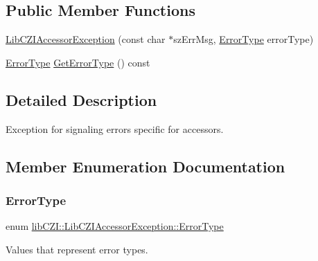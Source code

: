 \subsection*{Public Member Functions}
\begin{DoxyCompactItemize}
\item 
\hyperlink{classlib_c_z_i_1_1_lib_c_z_i_accessor_exception_a4eb949381be1d9ca7e1f1b65f5fdacd0}{Lib\+C\+Z\+I\+Accessor\+Exception} (const char $\ast$sz\+Err\+Msg, \hyperlink{classlib_c_z_i_1_1_lib_c_z_i_accessor_exception_afac26a03ad8be1d8314911a58b9b08b5}{Error\+Type} error\+Type)
\item 
\hyperlink{classlib_c_z_i_1_1_lib_c_z_i_accessor_exception_afac26a03ad8be1d8314911a58b9b08b5}{Error\+Type} \hyperlink{classlib_c_z_i_1_1_lib_c_z_i_accessor_exception_a8d5241a5d61e5d2ae97a6ee4c8f3e39e}{Get\+Error\+Type} () const
\end{DoxyCompactItemize}


\subsection{Detailed Description}
Exception for signaling errors specific for accessors. 

\subsection{Member Enumeration Documentation}
\mbox{\label{classlib_c_z_i_1_1_lib_c_z_i_accessor_exception_afac26a03ad8be1d8314911a58b9b08b5}} 
\subsubsection{\texorpdfstring{Error\+Type}{ErrorType}}
{\footnotesize\ttfamily enum \hyperlink{classlib_c_z_i_1_1_lib_c_z_i_accessor_exception_afac26a03ad8be1d8314911a58b9b08b5}{lib\+C\+Z\+I\+::\+Lib\+C\+Z\+I\+Accessor\+Exception\+::\+Error\+Type}\hspace{0.3cm}{\ttfamily [strong]}}



Values that represent error types. 

